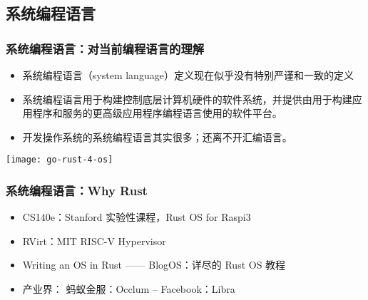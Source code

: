 \subsection{系统编程语言} %


\begin{frame}
	\frametitle{系统编程语言：\small{对当前编程语言的理解}}

	
	\begin{itemize}
		\item 系统编程语言（system language）定义现在似乎没有特别严谨和一致的定义
		\item 系统编程语言用于构建控制底层计算机硬件的软件系统，并提供由用于构建应用程序和服务的更高级应用程序编程语言使用的软件平台。
		\item 开发操作系统的系统编程语言其实很多；还离不开汇编语言。
	\end{itemize}
	\centering
	\texttt{[image: go-rust-4-os]}
\end{frame}

\begin{frame}
	\frametitle{系统编程语言：\small{Why Rust}}
	
		
		\begin{itemize}
			\item CS140e：Stanford 实验性课程，Rust OS for Raspi3
			\item RVirt：MIT RISC-V Hypervisor
			\item Writing an OS in Rust —— BlogOS：详尽的 Rust OS 教程
			\item 产业界： 蚂蚁金服：Occlum  -- Facebook：Libra
		\end{itemize}

	
\end{frame}



